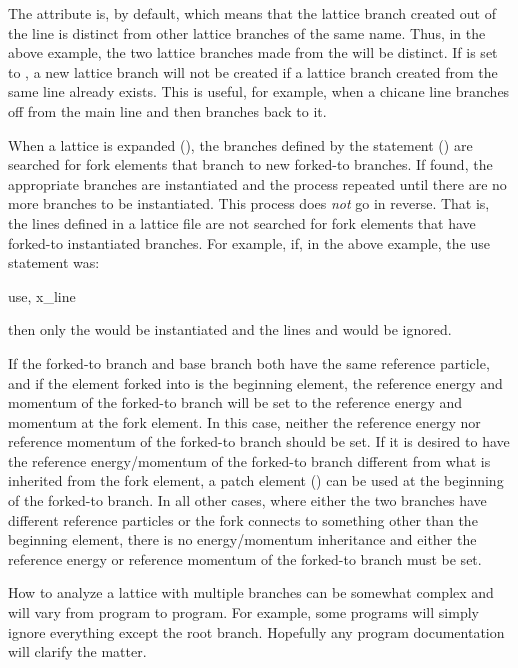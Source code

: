 The  attribute is, by default,  which means that the lattice branch created
out of the  line is distinct from other lattice branches of the same name. Thus, in the
above example, the two lattice branches made from the  will be distinct. If
 is set to , a new lattice branch will not be created if a lattice branch
created from the same line already exists. This is useful, for example, when a chicane line branches
off from the main line and then branches back to it.

When a lattice is expanded (), the branches defined by the  statement
() are searched for fork elements that branch to new forked-to branches. If found, the
appropriate branches are instantiated and the process repeated until there are no more branches to
be instantiated. This process does {\em not} go in reverse. That is, the lines defined in a lattice
file are not searched for fork elements that have forked-to instantiated branches. For example, if, in
the above example, the use statement was:
\begin{example}
  use, x_line
\end{example}
then only the  would be instantiated and the lines  and  would be
ignored.

If the forked-to branch and base branch both have the same reference particle, and if the element
forked into is the beginning element, the reference energy and momentum of the forked-to branch will be
set to the reference energy and momentum at the fork element. In this case, neither the reference
energy nor reference momentum of the forked-to branch should be set. If it is desired to have the
reference energy/momentum of the forked-to branch different from what is inherited from the fork
element, a patch element () can be used at the beginning of the forked-to branch. In all
other cases, where either the two branches have different reference particles or the fork connects
to something other than the beginning element, there is no energy/momentum inheritance and either
the reference energy or reference momentum of the forked-to branch must be set.

How to analyze a lattice with multiple branches can be somewhat complex and will vary from program
to program. For example, some programs will simply ignore everything except the root branch. Hopefully
any program documentation will clarify the matter.

\newpage

